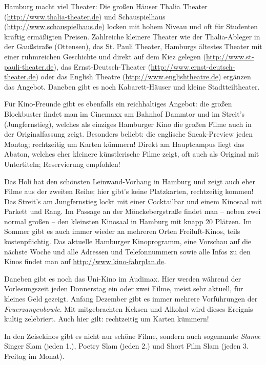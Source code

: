Hamburg macht viel Theater: Die großen Häuser Thalia Theater
(\url{http://www.thalia-theater.de}) und Schauspielhaus
(\url{http://www.schauspielhaus.de}) locken mit hohem Niveau und oft für
Studenten kräftig ermäßigten Preisen. Zahlreiche kleinere Theater wie der
Thalia-Ableger in der Gaußstraße (Ottensen), das St.  Pauli Theater, Hamburgs
ältestes Theater mit einer ruhmreichen Geschichte und direkt auf dem Kiez
gelegen (\url{http://www.st-pauli-theater.de}), das Ernst-Deutsch-Theater
(\url{http://www.ernst-deutsch-theater.de}) oder das English Theatre
(\url{http://www.englishtheatre.de}) ergänzen das Angebot. Daneben gibt es noch
Kabarett-Häuser und kleine Stadtteiltheater.

Für Kino-Freunde gibt es ebenfalls ein reichhaltiges Angebot: die großen
Blockbuster findet man im Cinemaxx am Bahnhof Dammtor und im Streit's
(Jungfernstieg), welches als einziges Hamburger Kino die großen Filme auch in
der Originalfassung zeigt. Besonders beliebt: die englische Sneak-Preview jeden
Montag; rechtzeitig um Karten kümmern! Direkt am Hauptcampus liegt das Abaton,
welches eher kleinere künstlerische Filme zeigt, oft auch als Original mit
Untertiteln; Reservierung empfohlen!

Das Holi hat den schönsten Leinwand-Vorhang in Hamburg und zeigt auch eher
Filme aus der zweiten Reihe; hier gibt's keine Platzkarten, rechtzeitig kommen!
Das Streit's am Jungfernstieg lockt mit einer Cocktailbar und einem Kinosaal
mit Parkett und Rang. Im Passage an der Mönckebergstraße findet man -- neben
zwei normal großen -- den kleinsten Kinosaal in Hamburg mit knapp 20 Plätzen.
Im Sommer gibt es auch immer wieder an mehreren Orten Freiluft-Kinos, teils
kostenpflichtig. Das aktuelle Hamburger Kinoprogramm, eine Vorschau auf die
nächste Woche und alle Adressen und Telefonnummern sowie alle Infos zu den Kinos
findet man auf \url{http://www.kino-fahrplan.de}.

Daneben gibt es noch das Uni-Kino im Audimax. Hier werden während der
Vorlesungszeit jeden Donnerstag ein oder zwei Filme, meist sehr aktuell, für
kleines Geld gezeigt. Anfang Dezember gibt es immer mehrere Vorführungen der
\emph{Feuerzangenbowle}. Mit mitgebrachten Keksen und Alkohol wird dieses
Ereignis kultig zelebriert. Auch hier gilt: rechtzeitig um Karten kümmern!

\begin{advice}
In den Zeisekinos gibt es nicht nur schöne Filme, sondern auch sogenannte
\emph{Slams}: Singer Slam (jeden 1.), Poetry Slam (jeden 2.) und Short Film
Slam (jeden 3. Freitag im Monat).
\end{advice}
